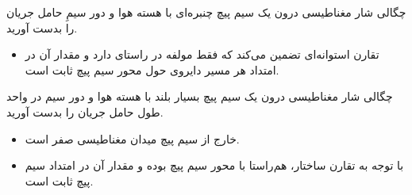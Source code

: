 \begin{ELexample}{}

چگالی شار مغناطیسی درون یک سیم پیچ چنبره‌ای با هسته هوا و  دور سیمِ حامل جریان  را بدست آورید.


\begin{ELsolution}

\begin{itemize}
\tightlist
\item
  تقارن استوانه‌ای تضمین می‌کند که  فقط مولفه در راستای \ELim{\phi} دارد و مقدار آن در امتداد هر مسیر دایروی حول محور سیم پیچ ثابت است.
\end{itemize}


\end{ELsolution}

\end{ELexample}


\begin{ELexample}{}

چگالی شار مغناطیسی درون یک سیم پیچ بسیار بلند با هسته هوا و  دور سیم در واحد طول حامل جریان  را بدست آورید.


\begin{ELsolution}

\begin{itemize}
\tightlist
\item
  خارج از سیم پیچ میدان مغناطیسی صفر است.
\item
  با توجه به تقارن ساختار،  هم‌راستا با محور سیم پیچ بوده و مقدار آن در امتداد سیم پیچ ثابت است.
\end{itemize}


\end{ELsolution}

\end{ELexample}

\ELhold



